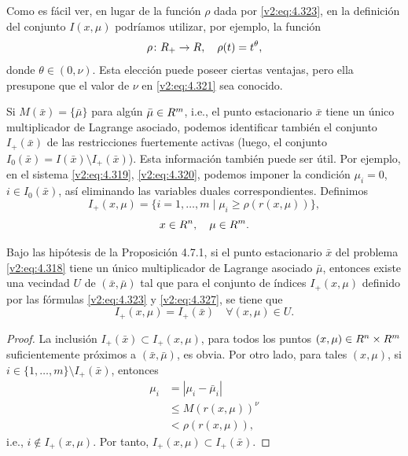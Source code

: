 Como es fácil ver, en lugar de la función $\rho$ dada por \eqref{v2:eq:4.323}, en la definición del conjunto $I(x, \mu)$ podríamos utilizar, por ejemplo, la función
\begin{equation}
    \rho \colon R_+ \to R, \quad \rho(t) = t^\theta,
    \label{v2:eq:4.326}
\end{equation}
donde $\theta \in (0, \nu)$. Esta elección puede poseer ciertas ventajas, pero ella presupone que el valor de $\nu$ en \eqref{v2:eq:4.321} sea conocido.


Si $M(\bar{x}) = \{\bar{\mu}\}$ para algún $\bar{\mu} \in R^m$, i.e., el punto estacionario $\bar{x}$ tiene un único multiplicador de Lagrange asociado, podemos identificar también el conjunto $I_+(\bar{x})$ de las restricciones fuertemente activas (luego, el conjunto $I_0(\bar{x}) = I(\bar{x}) \setminus I_+(\bar{x})$). Esta información también puede ser útil. Por ejemplo, en el sistema \eqref{v2:eq:4.319}, \eqref{v2:eq:4.320}, podemos imponer la condición $\mu_i = 0$, $i \in I_0(\bar{x})$, así eliminando las variables duales correspondientes.
Definimos
\begin{equation}
    I_+(x, \mu) = \{i = 1, \dots, m \mid \mu_i \ge \rho(r(x, \mu))\},
    \label{v2:eq:4.327}
\end{equation}
\[
    x \in R^n, \quad \mu \in R^m.
\]

\begin{proposition}\label{v2:prop:4.7.2}
    Bajo las hipótesis de la Proposición 4.7.1, si el punto estacionario $\bar{x}$ del problema \eqref{v2:eq:4.318} tiene un único multiplicador de Lagrange asociado $\bar{\mu}$, entonces existe una vecindad $U$ de $(\bar{x}, \bar{\mu})$ tal que para el conjunto de índices $I_+(x, \mu)$ definido por las fórmulas \eqref{v2:eq:4.323} y \eqref{v2:eq:4.327}, se tiene que
    \[
        I_+(x, \mu) = I_+(\bar{x}) \quad \forall (x, \mu) \in U.
    \]
\end{proposition}
\begin{proof}
    La inclusión $I_+(\bar{x}) \subset I_+(x, \mu)$, para todos los puntos $(x, \mu) \in R^n \times R^m$ suficientemente próximos a $(\bar{x}, \bar{\mu})$, es obvia.
    Por otro lado, para tales $(x, \mu)$, si $i \in \{1, \dots, m\} \setminus I_+(\bar{x})$, entonces
    \begin{align*}
        \mu_i &= |\mu_i - \bar{\mu}_i| \\
        &\le M(r(x, \mu))^\nu \\
        &< \rho(r(x, \mu)),
    \end{align*}
    i.e., $i \notin I_+(x, \mu)$. Por tanto, $I_+(x, \mu) \subset I_+(\bar{x})$.
\end{proof}

